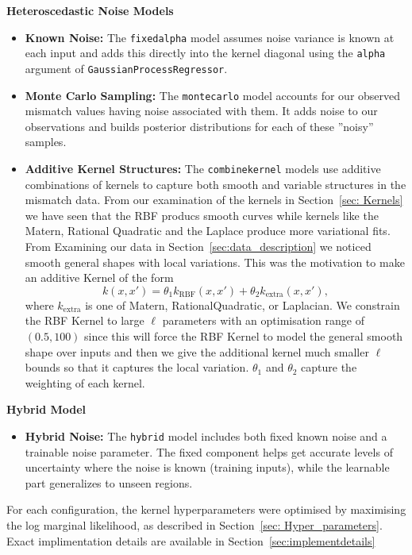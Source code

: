 \documentclass[12pt]{article}
\begin{document}
\noindent
\textbf{Heteroscedastic Noise Models}
\begin{itemize}
    \item \textbf{Known Noise:} The \texttt{fixedalpha} model assumes noise variance is known at each input and adds this directly into the kernel diagonal using the \texttt{alpha} argument of \texttt{GaussianProcessRegressor}.
    \item \textbf{Monte Carlo Sampling:} The \texttt{montecarlo} model accounts for our observed mismatch values having noise associated with them. It adds noise to our observations and builds posterior distributions for each of these ''noisy'' samples. 
    \item \textbf{Additive Kernel Structures:} The \texttt{combinekernel} models use additive combinations of kernels to capture both smooth and variable structures in the mismatch data. From our examination of the kernels in Section~\ref{sec: Kernels} we have seen that the RBF producs smooth curves while kernels like the Matern, Rational Quadratic and the Laplace produce more variational fits.
            From Examining our data in Section~\ref{sec:data_description} we noticed smooth general shapes with local variations. This was the motivation to make an additive Kernel of the form 
    \begin{equation}
        k(x, x') = \theta_1k_{\mathrm{RBF}}(x, x') + \theta_2k_{\mathrm{extra}}(x, x'),
    \end{equation}
    where \(k_{\mathrm{extra}}\) is one of Matern, RationalQuadratic, or Laplacian. We constrain the RBF Kernel to large \(\ell\) parameters with an optimisation range of \((0.5,100)\) since this will force the RBF Kernel to model the general smooth shape over inputs
    and then we give the additional kernel much smaller \(\ell\) bounds so that it captures the local variation. \(\theta_1\) and \(\theta_2\) capture the weighting of each kernel.
\end{itemize}
%
%

\noindent
\textbf{Hybrid Model}
\begin{itemize}
    \item \textbf{Hybrid Noise:} The \texttt{hybrid} model includes both fixed known noise and a trainable noise parameter. The fixed component helps get accurate levels of uncertainty where the noise is known (training inputs), while the learnable part generalizes to unseen regions.
\end{itemize}
%
For each configuration, the kernel hyperparameters were optimised by maximising the log marginal likelihood, as described in Section~\ref{sec: Hyper_parameters}. Exact implimentation details
are available in Section~\ref{sec:implementdetails}
%
%
%
\end{document}
